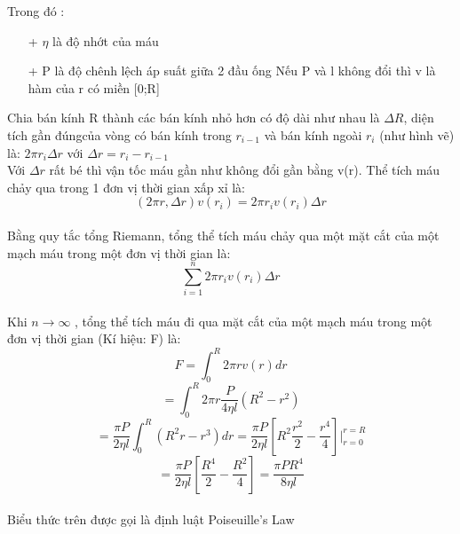 \documentclass[12pt,a4paper]{article}
\begin{document}
\begin{enumerate}[a/]
\begin{enumerate} [a/]
\begin{flushleft}
            Trong đó : \begin{enumerate}
                \item [+]  $\eta $ là độ nhớt của máu 
                \item [+]  P là độ chênh lệch áp suất giữa 2 đầu ống 
Nếu P và l không đổi thì v là hàm của r có miền [0;R]
            \end{enumerate}
            Chia bán kính R thành các bán kính nhỏ hơn có độ dài như nhau là $\Delta R$, diện tích gần đúngcủa vòng có bán kính trong $r_{i-1}$ và bán kính ngoài $r_i$ (như hình vẽ) là: $2\pi r_i \Delta r$ với $\Delta r= r_i-r_{i-1}$\\
            Với $\Delta r$ rất bé thì vận tốc máu gần như không đổi gần bằng v(r).
Thể tích máu chảy qua trong 1 đơn vị thời gian xấp xỉ là: 
            $$(2\pi r, \Delta r)v(r_i)=2\pi r_iv(r_i)\Delta r$$
            \\
            Bằng quy tắc tổng Riemann, tổng thể tích máu chảy qua một mặt cắt của một mạch máu trong một đơn vị thời gian là:
            $$\sum_{i=1}^n2\pi r_iv(r_i)\Delta r$$
            \\
            Khi $n \to \infty $ , tổng thể tích máu đi qua mặt cắt của một mạch máu trong một đơn vị thời gian (Kí hiệu: F) là: 
            $$F=\int_0^R 2\pi rv(r)dr$$
            $$=\int_0^R 2\pi r\frac{P}{4\eta l}(R^2-r^2)$$
            $$=\frac{\pi P}{2\eta l}\int_0^R (R^2r -r^3)dr= \frac{\pi P}{2\eta l}[R^2\frac{r^2}{2}-\frac{r^4}{4}]|_{r=0}^{r=R}$$
            $$=\frac{\pi P}{2\eta l}[\frac{R^4}{2}-\frac{R^2}{4}]=\frac{\pi PR^4}{8\eta l}$$
            \\
            Biểu thức trên được gọi là định luật Poiseuille’s Law


\end{flushleft}
\end{enumerate}
\end{enumerate}
\end{document}
